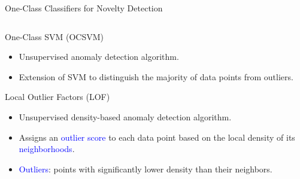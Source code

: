 \documentclass[aspectratio=169, 8pt]{beamer}
\begin{document}
\begin{frame}{One-Class Classifiers for Novelty Detection}

\begin{columns}[T]

    \begin{column}{0.5\linewidth}

    
    
        \begin{block}{One-Class SVM (OCSVM)}
            \begin{itemize}
                \item Unsupervised anomaly detection algorithm.
                \item Extension of SVM to distinguish the majority of data points from outliers.
            \end{itemize}
        \end{block}



        \begin{block}{Local Outlier Factors (LOF)}
            \begin{itemize}
                \item Unsupervised density-based anomaly detection algorithm.
                \item Assigns an \textcolor{blue}{outlier score} to each data point based on the local density of its \textcolor{blue}{neighborhoods}.
                \item \textcolor{blue}{Outliers}: points with significantly lower density than their neighbors.
            \end{itemize}

        \end{block}
    \end{column}
    

\end{columns}
\end{frame}
\end{document}
